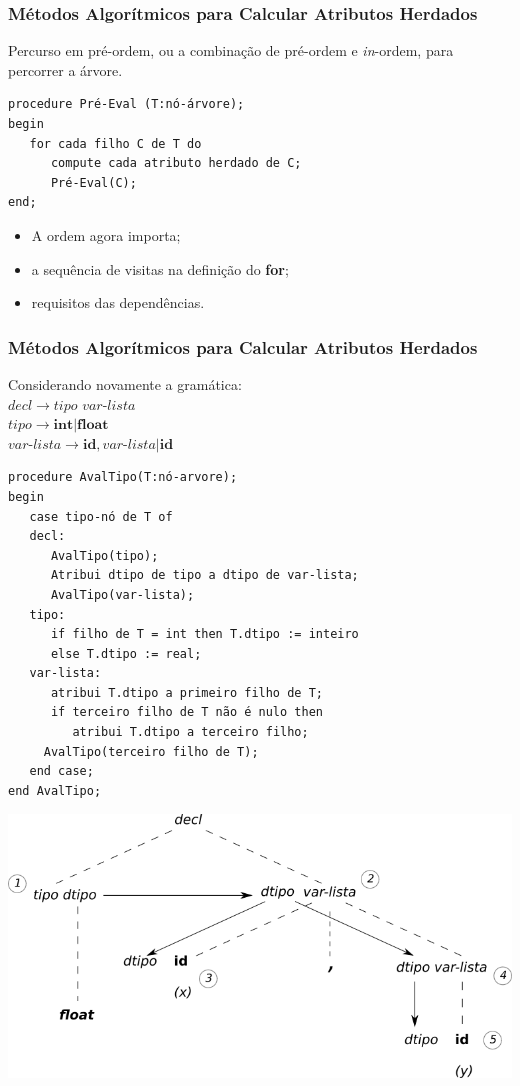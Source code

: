 \documentclass[table]{beamer}
\begin{document}
\begin{frame}[fragile]
   \frametitle{Métodos Algorítmicos para Calcular Atributos Herdados}
   Percurso em pré-ordem, ou a combinação de pré-ordem e \textit{in}-ordem, para percorrer a árvore.
   \begin{verbatim}
procedure Pré-Eval (T:nó-árvore);
begin
   for cada filho C de T do
      compute cada atributo herdado de C;
      Pré-Eval(C);
end;
   \end{verbatim}
   \begin{itemize}
      \item A ordem agora importa;
      \item a sequência de visitas na definição do \textbf{for};
      \item requisitos das dependências.
   \end{itemize}
\end{frame}

\begin{frame}[fragile]
   \frametitle{Métodos Algorítmicos para Calcular Atributos Herdados}
   Considerando novamente a gramática: \\
   $decl\to\textit{tipo var-lista}$ \\
   $tipo\to \textbf{int}|\textbf{float}$ \\
   $\textit{var-lista} \to \textbf{id},\textit{var-lista} | \textbf{id}$ \\
   \scriptsize
   \begin{verbatim}
procedure AvalTipo(T:nó-arvore);
begin
   case tipo-nó de T of
   decl:
      AvalTipo(tipo);
      Atribui dtipo de tipo a dtipo de var-lista;
      AvalTipo(var-lista);
   tipo:
      if filho de T = int then T.dtipo := inteiro
      else T.dtipo := real;
   var-lista:
      atribui T.dtipo a primeiro filho de T;
      if terceiro filho de T não é nulo then
         atribui T.dtipo a terceiro filho;
	 AvalTipo(terceiro filho de T);
   end case;
end AvalTipo;
   \end{verbatim}
\end{frame}

\begin{frame}
   \includegraphics[width=\linewidth,height=\textheight,keepaspectratio]{figuras/exemplo610.png}
\end{frame}
\end{document}
